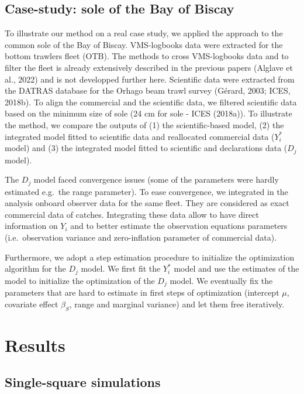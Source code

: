 \documentclass[
  english,
  man,floatsintext]{apa6}
\begin{document}
\hypertarget{case-study-sole-of-the-bay-of-biscay}{%
\subsection{Case-study: sole of the Bay of Biscay}\label{case-study-sole-of-the-bay-of-biscay}}

To illustrate our method on a real case study, we applied the approach to the common sole of the Bay of Biscay. VMS-logbooks data were extracted for the bottom trawlers fleet (OTB). The methods to cross VMS-logbooks data and to filter the fleet is already extensively described in the previous papers (Alglave et al., 2022) and is not developped further here. Scientific data were extracted from the DATRAS database for the Orhago beam trawl survey (Gérard, 2003; ICES, 2018b). To align the commercial and the scientific data, we filtered scientific data based on the minimum size of sole (24 cm for sole - ICES (2018a)). To illustrate the method, we compare the outputs of (1) the scientific-based model, (2) the integrated model fitted to scientific data and reallocated commercial data (\(Y^*_i\) model) and (3) the integrated model fitted to scientific and declarations data (\(D_j\) model).

The \(D_j\) model faced convergence issues (some of the parameters were hardly estimated e.g.~the range parameter). To ease convergence, we integrated in the analysis onboard observer data for the same fleet. They are considered as exact commercial data of catches. Integrating these data allow to have direct information on \(Y_i\) and to better estimate the observation equations parameters (i.e.~observation variance and zero-inflation parameter of commercial data).

Furthermore, we adopt a step estimation procedure to initialize the optimization algorithm for the \(D_j\) model. We first fit the \(Y^*_i\) model and use the estimates of the model to initialize the optimization of the \(D_j\) model. We eventually fix the parameters that are hard to estimate in first steps of optimization (intercept \(\mu\), covariate effect \(\beta_S\), range and marginal variance) and let them free iteratively.

\hypertarget{results}{%
\section{Results}\label{results}}

\hypertarget{single-square-simulations}{%
\subsection{Single-square simulations}\label{single-square-simulations}}
\end{document}
